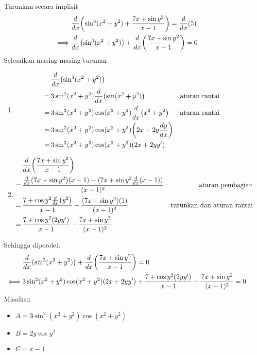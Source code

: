 \begin{enumerate}[leftmargin=*, label={\arabic*}.]
\begin{enumerate}[label={\alph*}.]
    Turunkan secara implisit 
    \begin{align*}
        &\drv{x}{\sin^{3}(x^2+y^2)+\frac{7x+\sin y^{2}}{x-1}}=\drv{x}{5}\\
        \iff &\drv{x}{\sin^{3}(x^2+y^2)}+\drv{x}{\frac{7x+\sin y^{2}}{x-1}} = 0
    \end{align*}
    Selesaikan masing-masing turunan
    \begin{enumerate}[label={\arabic*})]
        \item \begin{align*}
        &\drv{x}{\sin^{3}(x^2+y^2)}\\
        =\,&3\sin^{2}(x^{2}+y^{2})\drv{x}{\sin(x^{2}+y^{2})}
        &\text{aturan rantai}\\
        =\,&3\sin^{2}(x^{2}+y^{2})\cos(x^{2}+y^{2})\drv{x}{x^{2}+y^{2}}
        &\text{aturan rantai}\\
        =\,&3\sin^{2}(x^{2}+y^{2})\cos(x^{2}+y^{2})\brk*{2x+2y\frac{dy}{dx}}\\
        =\,&3\sin^{2}(x^{2}+y^{2})\cos(x^{2}+y^{2})(2x+2yy')
        \end{align*}
        \item \begin{align*}
            &\drv{x}{\frac{7x+\sin y^{2}}{x-1}} \\
            =\,&\frac{\drv{x}{7x+\sin y^{2}}(x-1)-(7x+\sin y^{2}\drv{x}{x-1})}{(x-1)^{2}}
            &\text{aturan pembagian}\\
            =\,& \frac{7+\cos y^{2}\drv{x}{y^{2}}}{x-1}-\frac{(7x+\sin y^{2})(1)}{(x-1)^{2}}
            &\text{turunkan dan aturan rantai}\\
            =\,&\frac{7+\cos y^{2}(2yy')}{x-1}-\frac{7x+\sin y^{2}}{(x-1)^{2}}
        \end{align*}
    \end{enumerate}
    Sehingga diperoleh 
    \begin{align*}
        &\drv{x}{\sin^{3}(x^2+y^2)}+\drv{x}{\frac{7x+\sin y^{2}}{x-1}} = 0\\
        \iff &3\sin^{2}(x^{2}+y^{2})\cos(x^{2}+y^{2})(2x+2yy') + 
        \frac{7+\cos y^{2}(2yy')}{x-1}-\frac{7x+\sin y^{2}}{(x-1)^{2}} = 0
    \end{align*}
    Misalkan 
    \begin{itemize}
        \item $A = 3\sin^{2}(x^{2}+y^{2})\cos(x^{2}+y^{2})$
        \item $B = 2y\cos y^{2}$
        \item $C = x-1$

\end{itemize}
\end{enumerate}
\end{enumerate}
